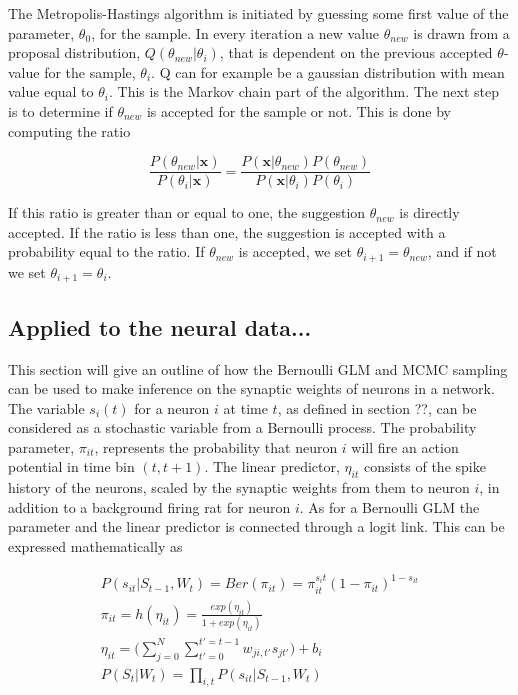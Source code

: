 The Metropolis-Hastings algorithm is initiated by guessing some first value of the parameter, $\theta_0$, for the sample. In every iteration a new value $\theta_{new}$ is drawn from a proposal distribution, $Q(\theta_{new}|\theta_i)$, that is dependent on the previous accepted $\theta$-value for the sample, $\theta_i$. Q can for example be a gaussian distribution with mean value equal to $\theta_i$. This is the Markov chain part of the algorithm. The next step is to determine if $\theta_{new}$ is accepted for the sample or not. This is done by computing the ratio

\begin{equation}
    \frac{P(\theta_{new}|{\bm x})}{P(\theta_i|{\bm x})} = 
    \frac{P({\bm x}|\theta_{new})P(\theta_{new})}{P({\bm x}|\theta_{i})P(\theta_{i})}
\end{equation}

If this ratio is greater than or equal to one, the suggestion $\theta_{new}$ is directly accepted. If the ratio is less than one, the suggestion is accepted with a probability equal to the ratio. If $\theta_{new}$ is accepted, we set $\theta_{i+1} = \theta_{new}$, and if not we set $\theta_{i+1} = \theta_i$.

\subsection{Applied to the neural data...}
This section will give an outline of how the Bernoulli GLM and MCMC sampling can be used to make inference on the synaptic weights of neurons in a network. The variable $s_i(t)$ for a neuron $i$ at time $t$, as defined in section ??, can be considered as a stochastic variable from a Bernoulli process. The probability parameter, $\pi_{it}$, represents the probability that neuron $i$ will fire an action potential in time bin $(t,t+1)$. The linear predictor, $\eta_{it}$ consists of the spike history of the neurons, scaled by the synaptic weights from them to neuron $i$, in addition to a background firing rat for neuron $i$. As for a Bernoulli GLM the parameter and the linear predictor is connected through a logit link. This can be expressed mathematically as

\begin{equation}
\begin{split}
    P(s_{it}|S_{t-1}, W_t) =  Ber(\pi_{it}) = \pi_{it}^{s_it}(1-\pi_{it})^{1-s_{it}} \\ \pi_{it} = h(\eta_{it})= \frac{exp(\eta_{it})}{1+exp(\eta_{it})}\\
    \eta_{it} = \Big (\sum_{j=0}^{N}\sum_{t'=0}^{t'=t-1} w_{ji,t'}s_{jt'} \Big) + b_i \\
    P(S_t|W_t) = \prod_{i,t} P(s_{it}|S_{t-1}, W_t)
\end{split}
\end{equation}

